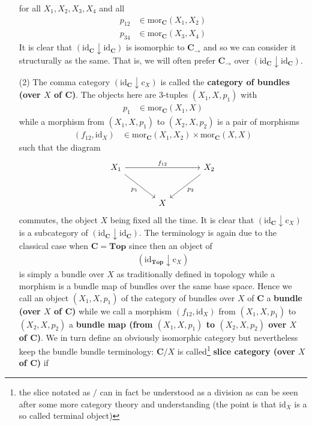 \begin{enumerate}
for all $X_{1},X_{2},X_{3},X_{4}$ and all
\begin{align*}
  p_{12}
  &\in
  \mathrm{mor}_{\mathbf{C}}(X_{1},X_{2})
  \\
  p_{34}
  &\in
  \mathrm{mor}_{\mathbf{C}}(X_{3},X_{4})
\end{align*}
It is clear that $(\mathrm{id}_{\mathbf{C}} \downarrow \mathrm{id}_{\mathbf{C}})$ is isomorphic to $\mathbf{C}_{\rightarrow}$ and so we can consider it structurally as the same. That is, we will often prefer $\mathbf{C}_{\rightarrow}$ over $(\mathrm{id}_{\mathbf{C}} \downarrow \mathrm{id}_{\mathbf{C}})$.
\item[(2)]
The comma category $(\mathrm{id}_{\mathbf{C}} \downarrow \mathrm{c}_{X})$ is called the \textbf{category of bundles (over $X$ of $\mathbf{C}$)}. The objects here are $3$-tuples $(X_{1},X,p_{1})$ with
\begin{align*}
  p_{1}
  &\in
  \mathrm{mor}_{\mathbf{C}}(X_{1},X)
\end{align*}
while a morphism from $(X_{1},X,p_{1})$ to $(X_{2},X,p_{2})$ is a pair of morphisms
\begin{align*}
  (f_{12},\mathrm{id}_{X})
  &\in
  \mathrm{mor}_{\mathbf{C}}(X_{1},X_{2})
  \times
  \mathrm{mor}_{\mathbf{C}}(X,X)
\end{align*}
such that the diagram
\[
\begin{tikzcd}[sep=large]
  X_{1}
  \arrow{rr}{f_{12}}
  \arrow[swap]{dr}{p_{1}}
  &
  &
  X_{2}
  \arrow{dl}{p_{2}}
  \\
  &
  X
  &
\end{tikzcd}
\]
commutes, the object $X$ being fixed all the time. It is clear that $(\mathrm{id}_{\mathbf{C}} \downarrow \mathrm{c}_{X})$ is a subcategory of $(\mathrm{id}_{\mathbf{C}} \downarrow \mathrm{id}_{\mathbf{C}})$. The terminology is again due to the classical case when $\mathbf{C} = \mathbf{Top}$ since then an object of
\begin{align*}
  (\mathrm{id}_{\mathbf{Top}} \downarrow \mathrm{c}_{X})
\end{align*}
is simply a bundle over $X$ as traditionally defined in topology while a morphism is a bundle map of bundles over the same base space. Hence we call an object $(X_{1},X,p_{1})$ of the category of bundles over $X$ of $\mathbf{C}$ a \textbf{bundle (over $X$ of $\mathbf{C}$)} while we call a morphism $(f_{12},\mathrm{id}_{X})$ from $(X_{1},X,p_{1})$ to $(X_{2},X,p_{2})$ a \textbf{bundle map (from $(X_{1},X,p_{1})$ to $(X_{2},X,p_{2})$ over $X$ of $\mathbf{C}$)}. We in turn define an obviously isomorphic category but nevertheless keep the bundle bundle terminology: $\mathbf{C} \slash X$ is called\footnote{the slice notated as $\slash$ can in fact be understood as a division as can be seen after some more category theory and understanding \cite{c55c71e8} (the point is that $\mathrm{id}_{X}$ is a so called terminal object)} \textbf{slice category (over $X$ of $\mathbf{C}$)} if

\end{enumerate}
